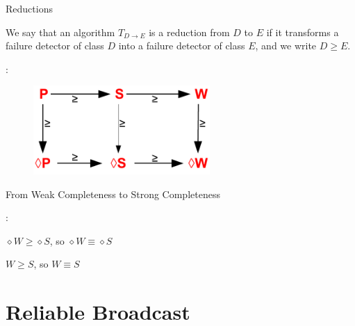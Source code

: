 \begin{frame}{Reductions}
	
\begin{definition}[Reduction]
We say that an algorithm $T_{D \rightarrow E}$ is a \alert{reduction} from $D$ to $E$ if it transforms 
a failure detector of class $D$ into a failure detector of class $E$, and we write $D \geq E$.
\end{definition}

:
\begin{figure}
\includegraphics[width=0.6\textwidth]{reductions}
\end{figure}

\end{frame}

\begin{frame}{From Weak Completeness to Strong Completeness}

\begin{Procedure}
\caption{Reduction from class $D$ to class $E$, executed by process $p_i$}	
	
\BlankLine
{}
\BlankLine
{}
\end{Procedure}	

:
\BI
\item $\diamond W \geq \diamond S$, so $\diamond W \equiv \diamond S$
\item $W \geq S$, so $W \equiv S$
\EI

\end{frame}


\section{Reliable Broadcast}


